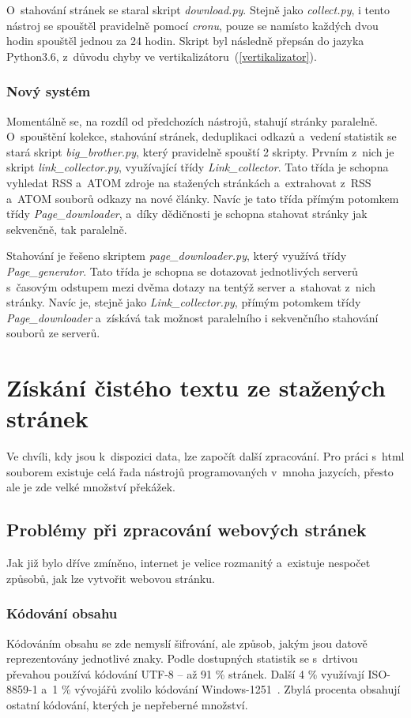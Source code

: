 O~stahování stránek se staral skript \textit{download.py}. Stejně jako \textit{collect.py}, i tento nástroj se spouštěl pravidelně
pomocí \textit{cronu}, pouze se namísto každých dvou hodin spouštěl jednou za 24 hodin. Skript byl následně přepsán do jazyka Python3.6,
z~důvodu chyby ve vertikalizátoru~(\ref{vertikalizator}).

\subsection{Nový systém}
Momentálně se, na rozdíl od předchozích nástrojů, stahují stránky paralelně. O~spouštění kolekce, stahování stránek, deduplikaci odkazů a~vedení statistik se
stará skript \textit{big\_brother.py}, který pravidelně spouští 2 skripty. Prvním z~nich je skript \textit{link\_collector.py}, využívající třídy \textit{Link\_collector}.
Tato třída je schopna vyhledat RSS a~ATOM zdroje na stažených stránkách a~extrahovat z~RSS a~ATOM souborů odkazy na nové články.
Navíc je tato třída přímým potomkem třídy \textit{Page\_downloader}, a~díky dědičnosti je schopna stahovat stránky jak sekvenčně, tak paralelně.

Stahování je řešeno skriptem \textit{page\_downloader.py}, který využívá třídy \textit{Page\_generator}. Tato třída je schopna se dotazovat jednotlivých serverů
s~časovým odstupem mezi dvěma dotazy na tentýž server a~stahovat z~nich stránky. Navíc je, stejně jako \textit{Link\_collector.py}, přímým potomkem
třídy \textit{Page\_downloader} a~získává tak možnost paralelního i sekvenčního stahování souborů ze serverů.

\chapter{Získání čistého textu ze stažených stránek}
\label{cisty_text}
Ve chvíli, kdy jsou k~dispozici data, lze započít další zpracování. Pro práci s~html souborem existuje celá řada nástrojů
programovaných v~mnoha jazycích, přesto ale je zde velké množství překážek.

\section{Problémy při zpracování webových stránek}
Jak již bylo dříve zmíněno, internet je velice rozmanitý a~existuje nespočet způsobů, jak lze vytvořit webovou stránku.

\subsection{Kódování obsahu}
Kódováním obsahu se zde nemyslí šifrování, ale způsob, jakým jsou datově reprezentovány jednotlivé znaky. Podle dostupných
statistik se s~drtivou převahou používá kódování UTF-8 -- až 91 \% stránek. Další 4 \% využívají ISO-8859-1 a~1 \%
vývojářů zvolilo kódování Windows-1251~\cite{W3TECHS}. Zbylá procenta obsahují ostatní kódování, kterých je nepřeberné množství.


